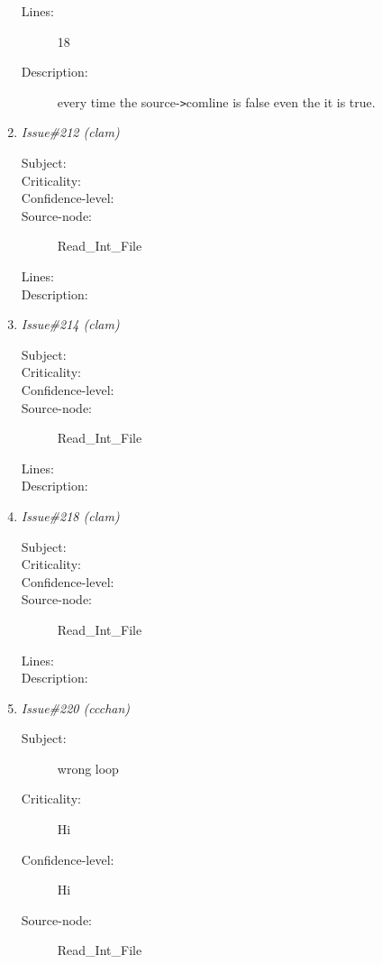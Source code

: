 \begin{enumerate}
\begin{description}
\item [Lines:] 18

\item [Description:] every time the source-{\tt >}comline is false even
the it is true.
\end{description}
\item {\it Issue\#212 (clam)}
\begin{description}
\item [Subject:] 
\item [Criticality:] 
\item [Confidence-level:] 
\item [Source-node:] Read\_Int\_File

\item [Lines:] 

\item [Description:] 
\end{description}
\item {\it Issue\#214 (clam)}
\begin{description}
\item [Subject:] 
\item [Criticality:] 
\item [Confidence-level:] 
\item [Source-node:] Read\_Int\_File

\item [Lines:] 

\item [Description:] 
\end{description}
\item {\it Issue\#218 (clam)}
\begin{description}
\item [Subject:] 
\item [Criticality:] 
\item [Confidence-level:] 
\item [Source-node:] Read\_Int\_File

\item [Lines:] 

\item [Description:] 
\end{description}
\item {\it Issue\#220 (ccchan)}
\begin{description}
\item [Subject:] wrong loop
\item [Criticality:] Hi
\item [Confidence-level:] Hi
\item [Source-node:] Read\_Int\_File


\end{description}
\end{enumerate}

